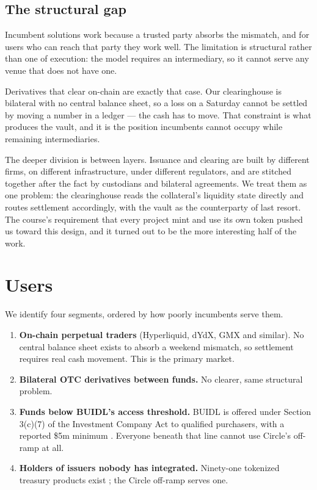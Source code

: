 \documentclass[11pt,a4paper]{article}
\begin{document}
\subsection{The structural gap}

Incumbent solutions work because a trusted party absorbs the mismatch, and for users who can reach
that party they work well. The limitation is structural rather than one of execution: the model
requires an intermediary, so it cannot serve any venue that does not have one.

Derivatives that clear on-chain are exactly that case. Our clearinghouse is bilateral with no central
balance sheet, so a loss on a Saturday cannot be settled by moving a number in a ledger --- the cash
has to move. That constraint is what produces the vault, and it is the position incumbents cannot
occupy while remaining intermediaries.

The deeper division is between layers. Issuance and clearing are built by different firms, on
different infrastructure, under different regulators, and are stitched together after the fact by
custodians and bilateral agreements. We treat them as one problem: the clearinghouse reads the
collateral's liquidity state directly and routes settlement accordingly, with the vault as the
counterparty of last resort. The course's requirement that every project mint and use its own token
pushed us toward this design, and it turned out to be the more interesting half of the work.

\section{Users}

We identify four segments, ordered by how poorly incumbents serve them.

\begin{enumerate}
  \item \textbf{On-chain perpetual traders} (Hyperliquid, dYdX, GMX and similar). No central balance
  sheet exists to absorb a weekend mismatch, so settlement requires real cash movement. This is the
  primary market.
  \item \textbf{Bilateral OTC derivatives between funds.} No clearer, same structural problem.
  \item \textbf{Funds below BUIDL's access threshold.} BUIDL is offered under Section 3(c)(7) of the
  Investment Company Act to qualified purchasers, with a reported \$5m minimum
  \cite{ecokyc,coinpaprika}. Everyone beneath that line cannot use Circle's off-ramp at all.
  \item \textbf{Holders of issuers nobody has integrated.} Ninety-one tokenized treasury products
  exist \cite{allium}; the Circle off-ramp serves one.
\end{enumerate}
\end{document}
